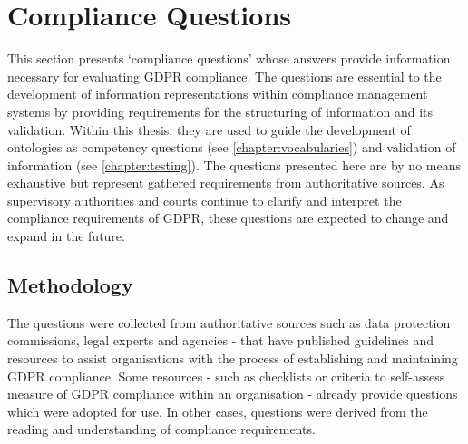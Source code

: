 \section{Compliance Questions}\label{sec:info:compliance-questions}
This section presents `compliance questions' whose answers provide information necessary for evaluating GDPR compliance. The questions are essential to the development of information representations within compliance management systems by providing requirements for the structuring of information and its validation. Within this thesis, they are used to guide the development of ontologies as competency questions (see \autoref{chapter:vocabularies}) and validation of information (see \autoref{chapter:testing}). The questions presented here are by no means exhaustive but represent gathered requirements from authoritative sources. As supervisory authorities and courts continue to clarify and interpret the compliance requirements of GDPR, these questions are expected to change and expand in the future.

\subsection{Methodology}\label{sec:info:compliance-questions-methodology}
The questions were collected from authoritative sources such as data protection commissions, legal experts and agencies - that have published guidelines and resources to assist organisations with the process of establishing and maintaining GDPR compliance.
Some resources - such  as checklists or criteria to self-assess measure of GDPR compliance within an organisation - already provide questions which were adopted for use. In other cases, questions were derived from the reading and understanding of compliance requirements. 

